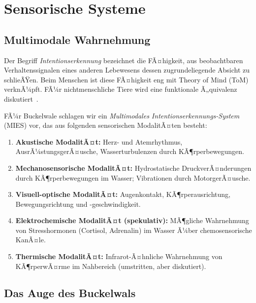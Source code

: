 ﻿\documentclass[12pt,a4paper]{article}
\theoremstyle{definition}
\theoremstyle{remark}
\begin{document}
\section{Sensorische Systeme}
\label{sec:wahrnehmung}

\subsection{Multimodale Wahrnehmung}

Der Begriff \emph{Intentionserkennung} bezeichnet die FÃ¤higkeit, aus
beobachtbaren Verhaltenssignalen eines anderen Lebewesens dessen zugrundeliegende
Absicht zu schlieÃŸen. Beim Menschen ist diese FÃ¤higkeit eng mit Theory of Mind
(ToM) verknÃ¼pft. FÃ¼r nichtmenschliche Tiere wird eine funktionale Ã„quivalenz
diskutiert~\cite{premack1978chimpanzee}.

FÃ¼r Buckelwale schlagen wir ein \emph{Multimodales Intentionserkennungs-System}
(MIES) vor, das aus folgenden sensorischen ModalitÃ¤ten besteht:

\begin{enumerate}[leftmargin=*, label=\textbf{M\arabic*.}]
  \item \textbf{Akustische ModalitÃ¤t:} Herz- und Atemrhythmus, AusrÃ¼stungsgerÃ¤usche,
        Wasserturbulenzen durch KÃ¶rperbewegungen.
  \item \textbf{Mechanosensorische ModalitÃ¤t:} Hydrostatische DruckverÃ¤nderungen
        durch KÃ¶rperbewegungen im Wasser; Vibrationen durch MotorgerÃ¤usche.
  \item \textbf{Visuell-optische ModalitÃ¤t:} Augenkontakt, KÃ¶rperausrichtung,
        Bewegungsrichtung und -geschwindigkeit.
  \item \textbf{Elektrochemische ModalitÃ¤t (spekulativ):} MÃ¶gliche Wahrnehmung
        von Stresshormonen (Cortisol, Adrenalin) im Wasser Ã¼ber chemosensorische
        KanÃ¤le.
  \item \textbf{Thermische ModalitÃ¤t:} Infrarot-Ã¤hnliche Wahrnehmung von
        KÃ¶rperwÃ¤rme im Nahbereich (umstritten, aber diskutiert).
\end{enumerate}

\subsection{Das Auge des Buckelwals}
\end{document}
